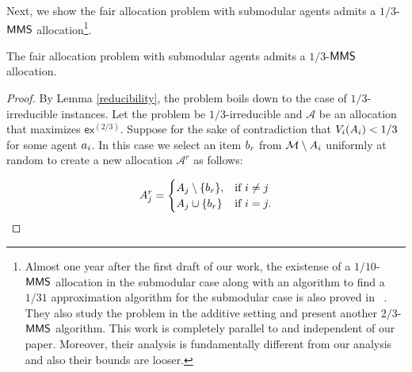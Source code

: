 Next, we show the fair allocation problem with submodular agents admits a $1/3$-$\mathsf{MMS}$ allocation\footnote{Almost one year after the first draft of our work, the existense of a $1/10$-$\mathsf{MMS}$ allocation in the submodular case along with an algorithm to find a $1/31$ approximation algorithm for the submodular case is also proved in ~\cite{barman2017approximation}. They also study the problem in the additive setting and present another $2/3$-$\mathsf{MMS}$ algorithm. This work is completely parallel to and independent of our paper. Moreover, their analysis is fundamentally different from our analysis and also their bounds are looser.}.
\begin{theorem}\label{submodulartheorem}
	The fair allocation problem with submodular agents admits a $1/3$-$\mathsf{MMS}$ allocation.
\end{theorem}
\begin{proof}
	By Lemma \ref{reducibility}, the problem boils down to the case of $1/3$-irreducible instances. Let the problem be $1/3$-irreducible and $\mathcal{A}$ be an allocation that maximizes $\mathsf{ex}^{(2/3)}$. Suppose for the sake of contradiction that $V_i(A_i) < 1/3$ for some agent $a_i$.
	In this case we select an item $b_r$ from $\mathcal{M} \setminus A_i$ uniformly at random to create a new allocation $\mathcal{A}^r$ as follows:
	 
	 $$A^r_j =
	 \begin{cases}
	 A_j \setminus \{b_r\}, & \text{if }i \neq j \\
	 A_j \cup \{b_r\} & \text{if }i = j.
	 \end{cases}$$
	

\end{proof}
